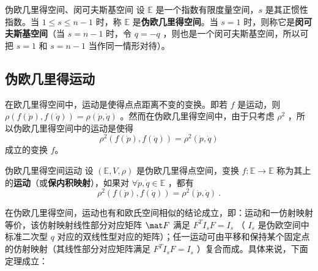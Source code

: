 \begin{definition}{伪欧几里得空间、闵可夫斯基空间}\label{def_EFSp_1}
设 $\mathbb E$ 是一个指数有限度量空间，$s$ 是其正惯性指数。当 $1\leq s\leq n-1$ 时，称 $\mathbb E$ 是\textbf{伪欧几里得空间}。当 $s=1$ 时，则称它是\textbf{闵可夫斯基空间}（当 $s=n-1$ 时，令 $q=-q$ ，则也是一个闵可夫斯基空间，所以可把 $s=1$ 和 $s=n-1$ 当作同一情形对待）。
\end{definition}
\subsection{伪欧几里得运动}
在欧几里得空间中，运动是使得点点距离不变的变换。即若 $f$ 是运动，则 $\rho(f(\dot p),f(\dot q))=\rho(\dot p,\dot q)$ 。然而在伪欧几里得空间中，由于只考虑 $\rho^2$ ，所以伪欧几里得空间中的运动是使得
\begin{equation}
\rho^2(f(\dot p),f(\dot q))=\rho^2(\dot p,\dot q)
\end{equation}
成立的变换 $f$。
\begin{definition}{伪欧几里得空间运动}
设 $(\mathbb E,V,\rho)$ 是伪欧几里得点空间，变换 $f:\mathbb E\rightarrow\mathbb E$ 称为其上的\textbf{运动}（或\textbf{保内积映射}），如果对 $\forall \dot p,\dot q\in\mathbb E$ ，都有
\begin{equation}
\rho^2(f(\dot p),f(\dot q))=\rho^2(\dot p,\dot q)~.
\end{equation}
\end{definition}
在伪欧几里得空间，运动也有和欧氏空间相似的结论成立，即：运动和一仿射映射等价，该仿射映射线性部分对应矩阵 $\mat F$ 满足 $F^TI_sF=I_s$ （ $I_s$ 是伪欧空间中标准二次型 $q$ 对应的双线性型对应的矩阵）；任一运动可由平移和保持某个固定点的仿射映射（其线性部分对应矩阵满足 $F^TI_sF=I_s$ ）复合而成。具体来说，下面定理成立：
\begin{theorem}{}

\end{theorem}